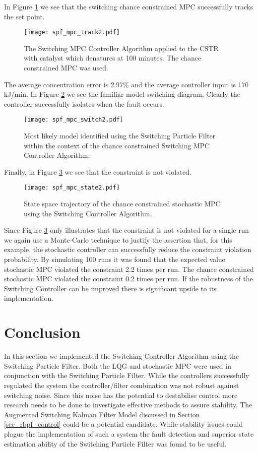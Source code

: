 In Figure \ref{fig_spf_mpc_track2} we see that the switching chance constrained MPC successfully tracks the set point.
\begin{figure}[H] 
\centering
\texttt{[image: spf\_mpc\_track2.pdf]}
\caption{The Switching MPC Controller Algorithm applied to the CSTR with catalyst which denatures at 100 minutes. The chance constrained MPC was used.}
\label{fig_spf_mpc_track2}
\end{figure}
The average concentration error is 2.97\% and the average controller input is 170 kJ/min. In Figure \ref{fig_spf_mpc_switch2} we see the familiar model switching diagram. Clearly the controller successfully isolates when the fault occurs.
\begin{figure}[H] 
\centering
\texttt{[image: spf\_mpc\_switch2.pdf]}
\caption{Most likely model identified using the Switching Particle Filter within the context of the chance constrained Switching MPC Controller Algorithm.}
\label{fig_spf_mpc_switch2}
\end{figure}
Finally, in Figure \ref{fig_spf_mpc_state2} we see that the constraint is not violated.
\begin{figure}[H] 
\centering
\texttt{[image: spf\_mpc\_state2.pdf]}
\caption{State space trajectory of the chance constrained stochastic MPC using the Switching Controller Algorithm.}
\label{fig_spf_mpc_state2}
\end{figure}
Since Figure \ref{fig_spf_mpc_state2} only illustrates that the constraint is not violated for a single run we again use a Monte-Carlo technique to justify the assertion that, for this example, the stochastic controller can successfully reduce the constraint violation probability. By simulating 100 runs it was found that the expected value stochastic MPC violated the constraint 2.2 times per run. The chance constrained stochastic MPC violated the constraint 0.2 times per run. If the robustness of the Switching Controller can be improved there is significant upside to its implementation.

\section{Conclusion}
In this section we implemented the Switching Controller Algorithm using the Switching Particle Filter. Both the LQG and stochastic MPC were used in conjunction with the Switching Particle Filter. While the controllers successfully regulated the system the controller/filter combination was not robust against switching noise. Since this noise has the potential to destabilise control more research needs to be done to investigate effective methods to assure stability. The Augmented Switching Kalman Filter Model discussed in Section \ref{sec_rbpf_control} could be a potential candidate. While stability issues could plague the implementation of such a system the fault detection and superior state estimation ability of the Switching Particle Filter was found to be useful.